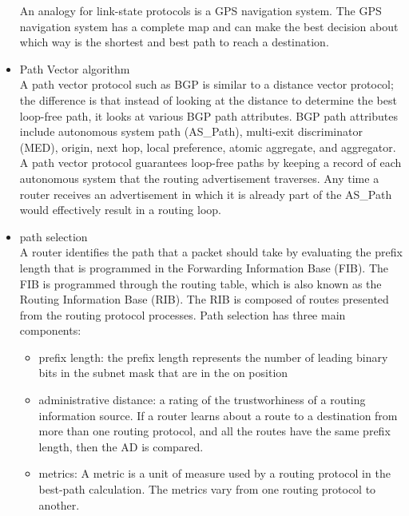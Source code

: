 \documentclass{article}
\begin{document}
\begin{itemize}
	An analogy for link-state protocols is a GPS navigation system. The GPS navigation system has a complete map and can make the best decision about which way is the shortest and best path to reach a destination.\\

\item Path Vector algorithm\\

	A path vector protocol such as BGP is similar to a distance vector protocol; the difference is that instead of looking at the distance to determine the best loop-free path, it looks at various BGP path attributes. BGP path attributes include autonomous system path (AS\_Path), multi-exit discriminator (MED), origin, next hop, local preference, atomic aggregate, and aggregator.\\

	A path vector protocol guarantees loop-free paths by keeping a record of each autonomous system that the routing advertisement traverses. Any time a router receives an advertisement in which it is already part of the AS\_Path would effectively result in a routing loop.\\

\item{path selection}\\

	A router identifies the path that a packet should take by evaluating the prefix length that is programmed in the Forwarding Information Base (FIB). The FIB is programmed through the routing table, which is also known as the Routing Information Base (RIB). The RIB is composed of routes presented from the routing protocol processes. Path selection has three main components:

	\begin{itemize}
	\item prefix length: the prefix length represents the number of leading binary bits in the subnet mask that are in the on position
	\item administrative distance: a rating of the trustworhiness of a routing information source. If a router learns about a route to a destination from more than one routing protocol, and all the routes have the same prefix length, then the AD is compared.
	\item metrics: A metric is a unit of measure used by a routing protocol in the best-path calculation. The metrics vary from one routing protocol to another.
	\end{itemize}


\end{itemize}
\end{document}
